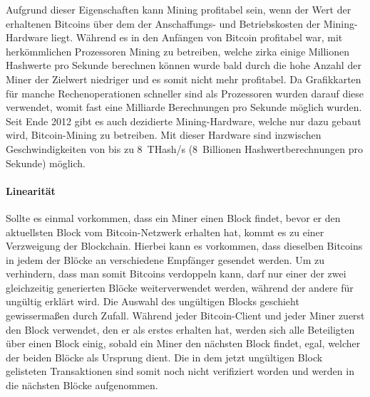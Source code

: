 Aufgrund dieser Eigenschaften kann Mining profitabel sein, wenn der Wert der erhaltenen Bitcoins über dem der Anschaffungs- und Betriebskosten der Mining-Hardware liegt.
Während es in den Anfängen von Bitcoin profitabel war, mit herkömmlichen Prozessoren Mining zu betreiben, welche zirka einige Millionen Hashwerte pro Sekunde berechnen können wurde bald durch die hohe Anzahl der Miner der Zielwert niedriger und es somit nicht mehr profitabel.
Da Grafikkarten für manche Rechenoperationen schneller sind als Prozessoren wurden darauf diese verwendet, womit fast eine Milliarde Berechnungen pro Sekunde möglich wurden.
Seit Ende 2012 gibt es auch dezidierte Mining-Hardware, welche nur dazu gebaut wird, Bitcoin-Mining zu betreiben.
Mit dieser Hardware sind inzwischen Geschwindigkeiten von bis zu 8~THash/s (8~Billionen Hashwertberechnungen pro Sekunde) möglich.

\paragraph{Linearität}

Sollte es einmal vorkommen, dass ein Miner einen Block findet, bevor er den aktuellsten Block vom Bitcoin-Netzwerk erhalten hat, kommt es zu einer Verzweigung der Blockchain.
Hierbei kann es vorkommen, dass dieselben Bitcoins in jedem der Blöcke an verschiedene Empfänger gesendet werden.
Um zu verhindern, dass man somit Bitcoins verdoppeln kann, darf nur einer der zwei gleichzeitig generierten Blöcke weiterverwendet werden, während der andere für ungültig erklärt wird.
Die Auswahl des ungültigen Blocks geschieht gewissermaßen durch Zufall.
Während jeder Bitcoin-Client und jeder Miner zuerst den Block verwendet, den er als erstes erhalten hat, werden sich alle Beteiligten über einen Block einig, sobald ein Miner den nächsten Block findet, egal, welcher der beiden Blöcke als Ursprung dient.
Die in dem jetzt ungültigen Block gelisteten Transaktionen sind somit noch nicht verifiziert worden und werden in die nächsten Blöcke aufgenommen.
